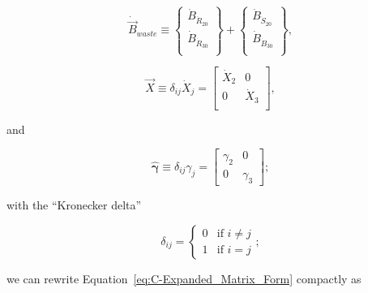 \begin{equation} \label{eq:waste_vec_def}
	\dot{\vec{B}}_{waste} 
	\equiv
	\begin{Bmatrix}
		\dot{B}_{\dot{R}_{20}}	\\
		\dot{B}_{\dot{R}_{30}}	\\
	\end{Bmatrix}
	+
	\begin{Bmatrix}
		\dot{B}_{\dot{S}_{20}}	\\
		\dot{B}_{\dot{B}_{30}}	\\
	\end{Bmatrix},
\end{equation} 

\begin{equation} \label{eq:X_hat_matrix_def}
	\hat{\vec{X}} 
	\equiv
	\delta_{ij} \dot{X}_{j} 
	= 
	\begin{bmatrix}
		\dot{X}_{2}		&	0	  \\
		0				&	\dot{X}_{3}	\\
	\end{bmatrix},
\end{equation} 

\noindent{}and

\begin{equation} \label{eq:gamma_hat_matrix_def}
	\hat{\bm{\gamma}}
	\equiv
	\delta_{ij} \gamma_{j}
	=
	\begin{bmatrix}
		\gamma_{2} & 0         \\
		0          & \gamma_{3}
	\end{bmatrix};
\end{equation}

\noindent{}with the ``Kronecker delta''

\begin{equation}\label{eq:k_delta}
	\delta_{ij} 
	=
	\begin{cases}	
		0	&	\text{if  } i \neq j	\\
		1 	& 	\text{if  } i = j
	\end{cases};
\end{equation}

\noindent{}we can rewrite Equation~\ref{eq:C-Expanded_Matrix_Form}
compactly as

